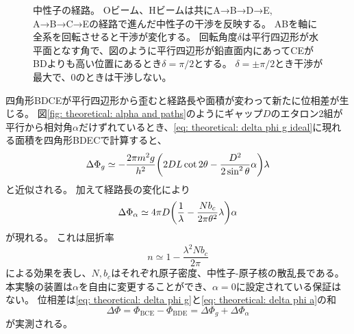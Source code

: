 \documentclass[dvipdfmx]{jsarticle}
\begin{document}
\begin{figure}
    \centering
    \caption{
        中性子の経路。
        Oビーム、Hビームは共にA→B→D→E, A→B→C→Eの経路で進んだ中性子の干渉を反映する。
        ABを軸に全系を回転させると干渉が変化する。
        回転角度$\delta$は平行四辺形が水平面となす角で、図のように平行四辺形が鉛直面内にあってCEがBDよりも高い位置にあるとき$\delta=\pi/2$とする。
        $\delta=\pm\pi/2$とき干渉が最大で、$0$のときは干渉しない。
    }
    \label{fig: theoretical: neutron paths and O/H beams}
\end{figure}


四角形BDCEが平行四辺形から歪むと経路長や面積が変わって新たに位相差が生じる。
図\ref{fig: theoretical: alpha and paths}のようにギャップ$D$のエタロン2組が平行から相対角$\alpha$だけずれているとき、\eqref{eq: theoretical: delta phi g ideal}に現れる面積を四角形BDECで計算すると、
\begin{equation}
    \label{eq: theoretical: delta phi g}
    \Delta\Phi_g
    \simeq
    -\frac{2\pi m^2g}{h^2}
    \qty(
        2DL\cot2\theta
        -
        \frac{D^2}{2\sin^2\theta}\alpha
    )\lambda
\end{equation}
と近似される。
加えて経路長の変化により
\begin{equation}
    \label{eq: theoretical: delta phi a}
    \Delta\Phi_\alpha
    \simeq
    4\pi D\qty(
        \frac{1}{\lambda}
        -
        \frac{Nb_c}{2\pi\theta^2}\lambda
    )\alpha
\end{equation}
が現れる。
これは屈折率
\begin{equation*}
    n
    \simeq
    1-\frac{\lambda^2Nb_c}{2\pi}
\end{equation*}
による効果を表し、$N, b_c$はそれぞれ原子密度、中性子-原子核の散乱長である。
\cite{Fujiie_2024}
本実験の装置は$\alpha$を自由に変更することができ、$\alpha=0$に設定されている保証はない。
位相差は\eqref{eq: theoretical: delta phi g}と\eqref{eq: theoretical: delta phi a}の和
\begin{equation}
    \label{eq: theoretical: delta phi}
    \Delta\Phi
    =
    \Phi_\mathrm{BCE}
    -
    \Phi_\mathrm{BDE}
    =
    \Delta\Phi_g
    +
    \Delta\Phi_\alpha
\end{equation}
が実測される。
\end{document}

